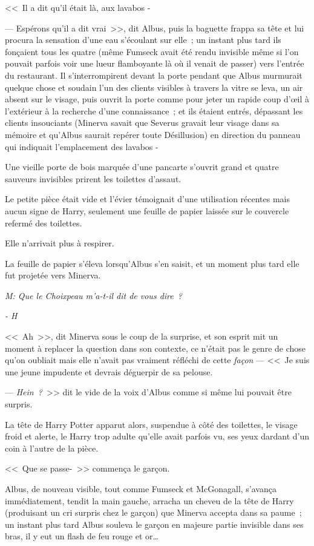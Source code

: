 <<~Il a dit qu'il était là, aux lavabos -

--- Espérons qu'il a dit vrai~>>, dit Albus, puis la baguette frappa sa tête et lui procura la sensation d'une eau s'écoulant sur elle~; un instant plus tard ils fonçaient tous les quatre (même Fumseck avait été rendu invisible même si l'on pouvait parfois voir une lueur flamboyante là où il venait de passer) vers l'entrée du restaurant. Il s'interrompirent devant la porte pendant que Albus murmurait quelque chose et soudain l'un des clients visibles à travers la vitre se leva, un air absent sur le visage, puis ouvrit la porte comme pour jeter un rapide coup d'œil à l'extérieur à la recherche d'une connaissance~; et ils étaient entrés, dépassant les clients insouciants (Minerva savait que Severus gravait leur visage dans sa mémoire et qu'Albus saurait repérer toute Désillusion) en direction du panneau qui indiquait l'emplacement des lavabos -

Une vieille porte de bois marquée d'une pancarte s'ouvrit grand et quatre sauveurs invisibles prirent les toilettes d'assaut.

Le petite pièce était vide et l'évier témoignait d'une utilisation récentes mais aucun signe de Harry, seulement une feuille de papier laissée sur le couvercle refermé des toilettes.

Elle n'arrivait plus à respirer.

La feuille de papier s'éleva lorsqu'Albus s'en saisit, et un moment plus tard elle fut projetée vers Minerva.

\emph{M: Que le Choixpeau m'a-t-il dit de vous dire~?}

\emph{- H}

<<~Ah~>>, dit Minerva sous le coup de la surprise, et son esprit mit un moment à replacer la question dans son contexte, ce n'était pas le genre de chose qu'on oubliait mais elle n'avait pas vraiment réfléchi de cette \emph{façon} — <<~Je suis une jeune impudente et devrais déguerpir de sa pelouse.

--- \emph{Hein~?}~>> dit le vide de la voix d'Albus comme si même lui pouvait être surpris.

La tête de Harry Potter apparut alors, suspendue à côté des toilettes, le visage froid et alerte, le Harry trop adulte qu'elle avait parfois vu, ses yeux dardant d'un coin à l'autre de la pièce.

<<~Que se passe-~>> commença le garçon.

Albus, de nouveau visible, tout comme Fumseck et McGonagall, s'avança immédiatement, tendit la main gauche, arracha un cheveu de la tête de Harry (produisant un cri surpris chez le garçon) que Minerva accepta dans sa paume~; un instant plus tard Albus souleva le garçon en majeure partie invisible dans ses bras, il y eut un flash de feu rouge et or…

